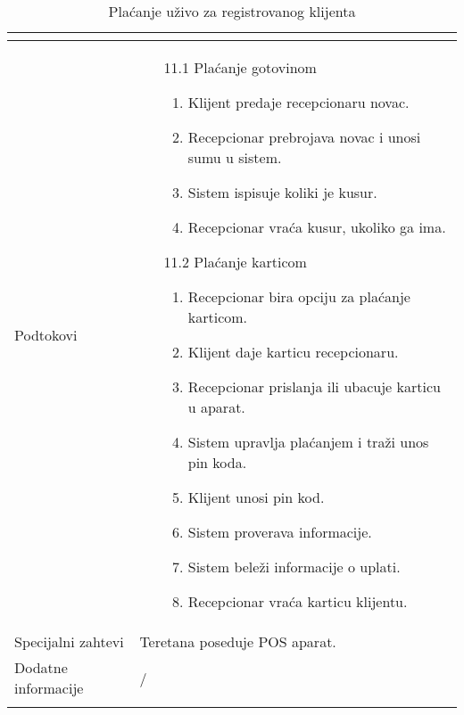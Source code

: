 \documentclass[../main.tex]{subfiles}
\begin{document}
\begin{longtable}{| p{} | p{} |}
\begin{itemize}
    \end{itemize}\\
\hline
    Podtokovi & \begin{itemize}
        \item[11.1] Plaćanje gotovinom \begin{enumerate}
            \item Klijent predaje recepcionaru novac.
            \item Recepcionar prebrojava novac i unosi sumu u sistem.
            \item Sistem ispisuje koliki je kusur.
            \item Recepcionar vraća kusur, ukoliko ga ima.
        \end{enumerate} 
        \item[11.2] Plaćanje karticom \begin{enumerate}
            \item Recepcionar bira opciju za plaćanje karticom.
            \item Klijent daje karticu recepcionaru.
            \item Recepcionar prislanja ili ubacuje karticu u aparat.
            \item Sistem upravlja plaćanjem i traži unos pin koda.
            \item Klijent unosi pin kod.
            \item Sistem proverava informacije.
            \item Sistem beleži informacije o uplati.
            \item Recepcionar vraća karticu klijentu.	
        \end{enumerate}
    \end{itemize}\\
\hline
    Specijalni zahtevi & Teretana poseduje POS aparat.\\
\hline
    Dodatne informacije & /\\
\hline
\caption{Plaćanje uživo za registrovanog klijenta} %
\end{longtable}
\end{document}
